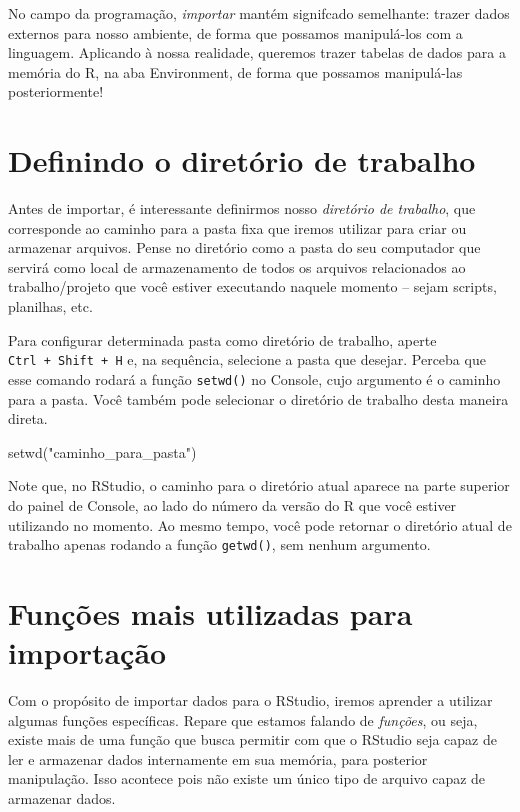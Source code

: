 \documentclass[
  letterpaper,
  DIV=11,
  numbers=noendperiod]{scrreprt}
\newenvironment{Shaded}{\begin{snugshade}}{\end{snugshade}}
\newcommand{\FunctionTok}[1]{\textcolor[rgb]{0.28,0.35,0.67}{#1}}
\newcommand{\NormalTok}[1]{\textcolor[rgb]{0.00,0.23,0.31}{#1}}
\newcommand{\StringTok}[1]{\textcolor[rgb]{0.13,0.47,0.30}{#1}}
\begin{document}
No campo da programação, \emph{importar} mantém signifcado semelhante:
trazer dados externos para nosso ambiente, de forma que possamos
manipulá-los com a linguagem. Aplicando à nossa realidade, queremos
trazer tabelas de dados para a memória do R, na aba Environment, de
forma que possamos manipulá-las posteriormente!

\section{Definindo o diretório de
trabalho}\label{definindo-o-diretuxf3rio-de-trabalho}

Antes de importar, é interessante definirmos nosso \emph{diretório de
trabalho}, que corresponde ao caminho para a pasta fixa que iremos
utilizar para criar ou armazenar arquivos. Pense no diretório como a
pasta do seu computador que servirá como local de armazenamento de todos
os arquivos relacionados ao trabalho/projeto que você estiver executando
naquele momento -- sejam scripts, planilhas, etc.

Para configurar determinada pasta como diretório de trabalho, aperte
\texttt{Ctrl\ +\ Shift\ +\ H} e, na sequência, selecione a pasta que
desejar. Perceba que esse comando rodará a função \texttt{setwd()} no
Console, cujo argumento é o caminho para a pasta. Você também pode
selecionar o diretório de trabalho desta maneira direta.

\begin{Shaded}
\begin{Highlighting}[]
\FunctionTok{setwd}\NormalTok{(}\StringTok{"caminho\_para\_pasta"}\NormalTok{)}
\end{Highlighting}
\end{Shaded}

Note que, no RStudio, o caminho para o diretório atual aparece na parte
superior do painel de Console, ao lado do número da versão do R que você
estiver utilizando no momento. Ao mesmo tempo, você pode retornar o
diretório atual de trabalho apenas rodando a função \texttt{getwd()},
sem nenhum argumento.

\section{Funções mais utilizadas para
importação}\label{funuxe7uxf5es-mais-utilizadas-para-importauxe7uxe3o}

Com o propósito de importar dados para o RStudio, iremos aprender a
utilizar algumas funções específicas. Repare que estamos falando de
\emph{funções}, ou seja, existe mais de uma função que busca permitir
com que o RStudio seja capaz de ler e armazenar dados internamente em
sua memória, para posterior manipulação. Isso acontece pois não existe
um único tipo de arquivo capaz de armazenar dados.
\end{document}
